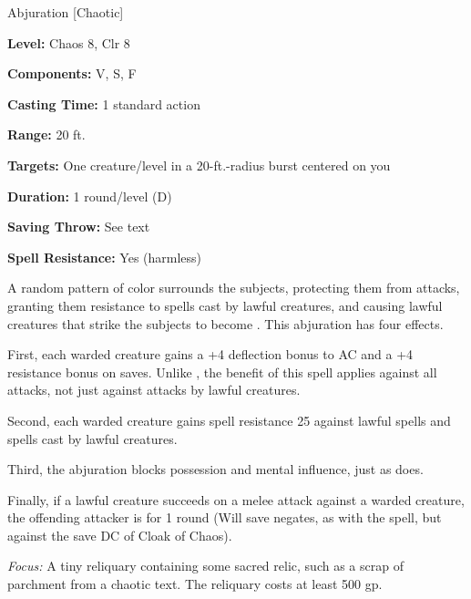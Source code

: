 
Abjuration [Chaotic]

\textbf{Level:} Chaos 8, Clr 8

\textbf{Components:} V, S, F

\textbf{Casting Time:} 1 standard action

\textbf{Range:} 20 ft.

\textbf{Targets:} One creature/level in a 20-ft.-radius burst centered on you

\textbf{Duration:} 1 round/level (D)

\textbf{Saving Throw:} See text

\textbf{Spell Resistance:} Yes (harmless)

A random pattern of color surrounds the subjects, protecting them from attacks, 
granting them resistance to spells cast by lawful creatures, and causing lawful 
creatures that strike the subjects to become . This abjuration 
has four effects.

First, each warded creature gains a +4 deflection bonus to AC and a +4 resistance 
bonus on saves. Unlike , the benefit of this spell 
applies against all attacks, not just against attacks by lawful creatures.

Second, each warded creature gains spell resistance 25 against lawful spells and 
spells cast by lawful creatures.

Third, the abjuration blocks possession and mental influence, just as  does.

Finally, if a lawful creature succeeds on a melee attack against a warded creature, 
the offending attacker is  for 1 round (Will save negates, as 
with the  spell, but against the save DC of Cloak of Chaos).

\textit{Focus:} A tiny reliquary containing some sacred relic, such as a scrap 
of parchment from a chaotic text. The reliquary costs at least 500 gp.

